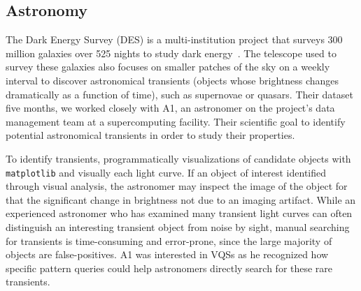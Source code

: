  \subsection{Astronomy}
 \par\noindent{} 
 \npar The Dark Energy Survey (DES) is a multi-institution project that surveys 300 million galaxies over 525 nights to study dark energy~\cite{DrlicaWagner2018}. The telescope used to survey these galaxies also focuses on smaller patches of the sky on a weekly interval to discover astronomical transients (objects whose brightness changes dramatically as a function of time), such as supernovae or quasars. Their dataset  five months, we worked closely with A1, an astronomer on the project's data management team at a supercomputing facility. Their scientific goal  to identify potential astronomical transients in order to study their properties. 
 \par\noindent{} 
 \npar To identify transients,  programmatically  visualizations of candidate objects with \texttt{matplotlib} and visually  each light curve. If an object of interest  identified through visual analysis, the astronomer may inspect the image of the object for  that the significant change in brightness  not due to an imaging artifact. While an experienced astronomer who has examined many transient light curves can often distinguish an interesting transient object from noise by sight, manual searching for transients is time-consuming and error-prone, since the large majority of objects are false-positives. A1 was interested in VQSs as he recognized how specific pattern queries could help astronomers directly search for these rare transients.

